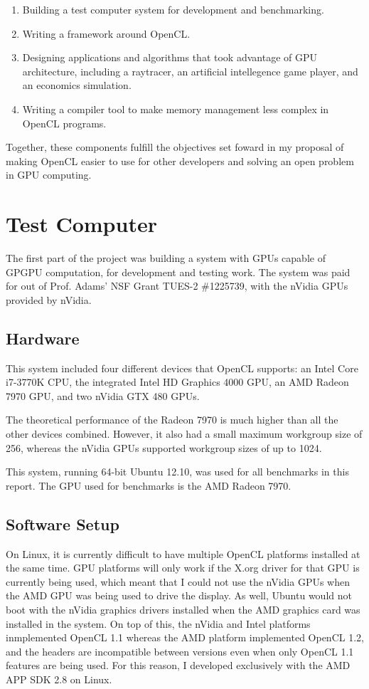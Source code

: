 \documentclass{article}
\begin{document}
\begin{enumerate}
\item
Building a test computer system for development and benchmarking.
\item
Writing a framework around OpenCL.
\item 
Designing applications and algorithms that took advantage of GPU architecture, including a raytracer, an artificial intellegence game player, and an economics simulation.
\item
Writing a compiler tool to make memory management less complex in OpenCL programs.
\end{enumerate}

Together, these components fulfill the objectives set foward in my proposal of making OpenCL easier to use for other developers and solving an open problem in GPU computing.

\tableofcontents

\section{Test Computer}
The first part of the project was building a system with GPUs capable of GPGPU computation, for development and testing work. The system was paid for out of Prof. Adams' NSF Grant TUES-2 \#1225739, with the nVidia GPUs provided by nVidia.

\subsection{Hardware}
This system included four different devices that OpenCL supports: an Intel Core i7-3770K CPU, the integrated Intel HD Graphics 4000 GPU, an AMD Radeon 7970 GPU, and two nVidia GTX 480 GPUs.

The theoretical performance of the Radeon 7970 is much higher than all the other devices combined. However, it also had a small maximum workgroup size of 256, whereas the nVidia GPUs supported workgroup sizes of up to 1024.

This system, running 64-bit Ubuntu 12.10, was used for all benchmarks in this report. The GPU used for benchmarks is the AMD Radeon 7970.

\subsection{Software Setup}
On Linux, it is currently difficult to have multiple OpenCL platforms installed at the same time. GPU platforms will only work if the X.org driver for that GPU is currently being used, which meant that I could not use the nVidia GPUs when the AMD GPU was being used to drive the display. As well, Ubuntu would not boot with the nVidia graphics drivers installed when the AMD graphics card was installed in the system. On top of this, the nVidia and Intel platforms inmplemented OpenCL 1.1 whereas the AMD platform implemented OpenCL 1.2, and the headers are incompatible between versions even when only OpenCL 1.1 features are being used. For this reason, I developed exclusively with the AMD APP SDK 2.8 on Linux.
\end{document}
